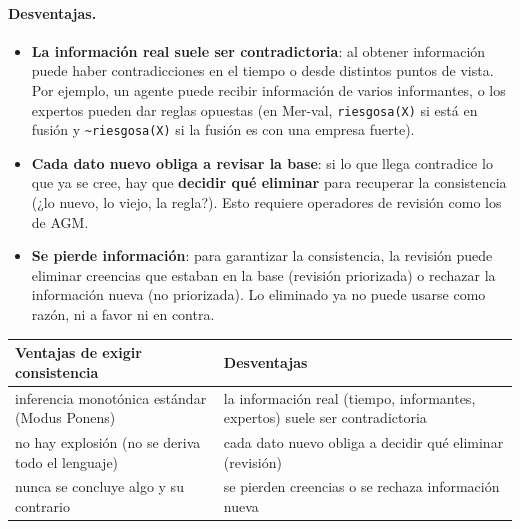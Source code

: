 \documentclass[11pt,a4paper]{article}
\newcommand{\nf}{\textasciitilde}
\begin{document}
\paragraph{Desventajas.}
\begin{itemize}
  \item \textbf{La información real suele ser contradictoria}: al obtener información puede haber contradicciones en el tiempo o desde distintos puntos de vista. Por ejemplo, un agente puede recibir información de varios informantes, o los expertos pueden dar reglas opuestas (en Mer-val, \texttt{riesgosa(X)} si está en fusión y \texttt{\nf riesgosa(X)} si la fusión es con una empresa fuerte).
  \item \textbf{Cada dato nuevo obliga a revisar la base}: si lo que llega contradice lo que ya se cree, hay que \textbf{decidir qué eliminar} para recuperar la consistencia (¿lo nuevo, lo viejo, la regla?). Esto requiere operadores de revisión como los de AGM.
  \item \textbf{Se pierde información}: para garantizar la consistencia, la revisión puede eliminar creencias que estaban en la base (revisión priorizada) o rechazar la información nueva (no priorizada). Lo eliminado ya no puede usarse como razón, ni a favor ni en contra.
\end{itemize}

\begin{center}
\small
\begin{tabularx}{\linewidth}{@{}X X@{}}
\toprule
\textbf{Ventajas de exigir consistencia} & \textbf{Desventajas} \\
\midrule
inferencia monotónica estándar (Modus Ponens) & la información real (tiempo, informantes, expertos) suele ser contradictoria \\
no hay explosión (no se deriva todo el lenguaje) & cada dato nuevo obliga a decidir qué eliminar (revisión) \\
nunca se concluye algo y su contrario & se pierden creencias o se rechaza información nueva \\
\bottomrule
\end{tabularx}
\end{center}
\end{document}

